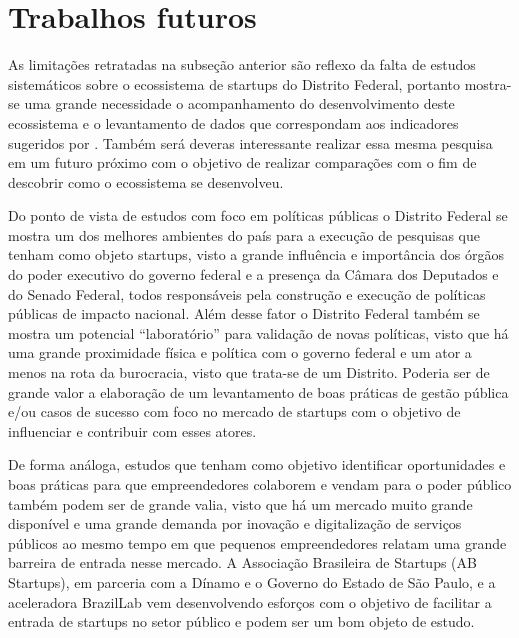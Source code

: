 \section{Trabalhos futuros}
\label{subsection:trabalhos_futuros}

As limitações retratadas na subseção anterior são reflexo da falta de estudos sistemáticos sobre o ecossistema de startups do Distrito Federal, portanto mostra-se uma grande necessidade o acompanhamento do desenvolvimento deste ecossistema e o levantamento de dados que correspondam aos indicadores sugeridos por . Também será deveras interessante realizar essa mesma pesquisa em um futuro próximo com o objetivo de realizar comparações com o fim de descobrir como o ecossistema se desenvolveu.

Do ponto de vista de estudos com foco em políticas públicas o Distrito Federal se mostra um dos melhores ambientes do país para a execução de pesquisas que tenham como objeto startups, visto a grande influência e importância dos órgãos do poder executivo do governo federal e a presença da Câmara dos Deputados e do Senado Federal, todos responsáveis pela construção e execução de políticas públicas de impacto nacional. Além desse fator o Distrito Federal também se mostra um potencial ``laboratório'' para validação de novas políticas, visto que há uma grande proximidade física e política com o governo federal e um ator a menos na rota da burocracia, visto que trata-se de um Distrito. Poderia ser de grande valor a elaboração de um levantamento de boas práticas de gestão pública e/ou casos de sucesso com foco no mercado de startups com o objetivo de influenciar e contribuir com esses atores. 

De forma análoga, estudos que tenham como objetivo identificar oportunidades e boas práticas para que empreendedores colaborem e vendam para o poder público também podem ser de grande valia, visto que há um mercado muito grande disponível e uma grande demanda por inovação e digitalização de serviços públicos ao mesmo tempo em que pequenos empreendedores relatam uma grande barreira de entrada nesse mercado. A Associação Brasileira de Startups (AB Startups), em parceria com a Dínamo e o Governo do Estado de São Paulo, e a aceleradora BrazilLab vem desenvolvendo esforços com o objetivo de facilitar a entrada de startups no setor público e podem ser um bom objeto de estudo.